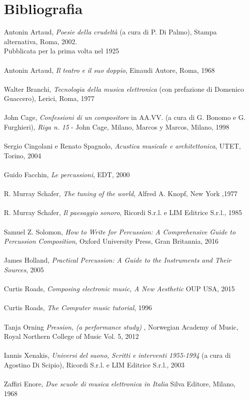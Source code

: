 
\chapter{Bibliografia}
\label{chp:Bibliografia}

Antonin Artaud, \textit{Poesie della crudeltà} (a cura di P. Di Palmo), Stampa alternativa, Roma, 2002. \\
Pubblicata per la prima volta nel 1925 \\
\\
Antonin Artaud, \textit{Il teatro e il suo doppio}, Einaudi Autore, Roma, 1968 \\
\\
Walter Branchi, \textit{Tecnologia della musica elettronica} (con prefazione di Domenico Guaccero), Lerici, Roma, 1977 \\
\\
John Cage, \textit{Confessioni di un compositore} in AA.VV. (a cura di G. Bonomo e G. Furghieri), \textit{Riga n. 15} - John Cage, Milano, Marcos y Marcos, Milano, 1998\\ 
\\
Sergio Cingolani e Renato Spagnolo, \textit{Acustica musicale e architettonica}, UTET, Torino, 2004 \\
\\
Guido Facchin,  \textit{Le percussioni}, EDT, 2000 \\
\\
R. Murray Schafer, \textit{The tuning of the world}, Alfred A. Knopf, New York ,1977 \\
\\
R. Murray Schafer, \textit{Il paesaggio sonoro}, Ricordi S.r.l. e LIM Editrice S.r.l., 1985 \\
\\
Samuel Z. Solomon, \textit{How to Write for Percussion: A Comprehensive Guide to Percussion Composition}, Oxford University Press, Gran Britannia, 2016\\
 \\
James Holland, \textit{Practical Percussion: A Guide to the Instruments and Their Sources}, 2005 \\
\\
Curtis Roads, \textit{Composing electronic music, A New Aesthetic} OUP USA, 2015 \\
\\
Curtis Roads, \textit{The Computer music tutorial}, 1996 \\
\\
Tanja Orning \textit{Pression, (a performance study) }, Norwegian Academy of Music, Royal Northern College of Music Vol. 5, 2012 \\
\\
Iannis Xenakis, \textit{Universi del suono, Scritti e interventi 1955-1994} (a cura di Agostino Di Scipio), Ricordi S.r.l. e LIM Editrice S.r.l., 2003 \\
\\
Zaffiri Enore, \textit{Due scuole di musica elettronica in Italia} Silva Editore, Milano, 1968 